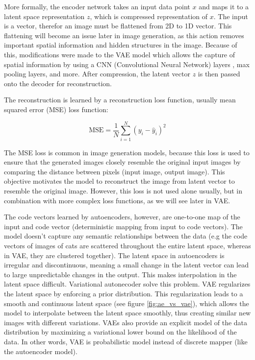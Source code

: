 More formally, the encoder network takes an input data point $x$ and maps it to a latent space representation $z$, which is compressed representation of $x$. The input is a vector, therefor an image must be flattened from 2D to 1D vector. This flattening will become an issue later in image generation, as this action removes important spatial information and hidden structures in the image. Because of this, modifications were made to the VAE model which allows the capture of spatial information by using a CNN (Convolutional Neural Network) \cite{cnn} layers \cite{vae_cnn_example}, max pooling layers, and more. After compression, the latent vector $z$ is then passed onto the decoder for reconstruction. 

The reconstruction is learned by a reconstruction loss function, usually mean squared error (MSE) loss function:

\begin{equation}
    \text{MSE} = \frac{1}{N} \sum_{i=1}^{N} (y_i - \hat{y}_i)^2
\label{eq:mse}
\end{equation}

The MSE loss is common in image generation models, because this loss is used to ensure that the generated images closely resemble the original input images by comparing the distance between pixels (input image, output image). This objective motivates the model to reconstruct the image from latent vector to resemble the original image. However, this loss is not used alone usually, but in combination with more complex loss functions, as we will see later in VAE.

The code vectors learned by autoencoders, however, are one-to-one map of the input and code vector (deterministic mapping from input to code vectors). The model doesn't capture any semantic relationships between the data (e.g the code vectors of images of cats are scattered throughout the entire latent space, whereas in VAE, they are clustered together). The latent space in autoencoders is irregular and discontinuous, meaning a small change in the latent vector can lead to large unpredictable changes in the output. This makes interpolation in the latent space difficult. Variational autonecoder solve this problem. VAE regularizes the latent space by enforcing a prior distribution. This regularization leads to a smooth and continuous latent space (see figure \ref{fig:ae_vs_vae}), which allows the model to interpolate between the latent space smoothly, thus creating similar new images with different variations. VAEs also provide an explicit model of the data distribution by maximizing a variational lower bound on the likelihood of the data. In other words, VAE is probabilistic model instead of discrete mapper (like the autoencoder model).

